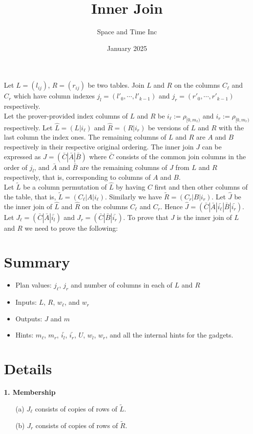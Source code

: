 \documentclass[11pt]{article}
\title{Inner Join}
\author{Space and Time Inc}
\date{January 2025}
\begin{document}
\maketitle

\noindent Let $L = (l_{ij})$, $R = (r_{ij})$ be two tables. Join $L$ and $R$ on the columns $C_\ell$ and $C_r$ which have column indexes $j_l = (l'_0,\cdots, l'_{k-1})$ and $j_r = (r'_0,\cdots, r'_{k-1})$ respectively. \\
\noindent Let the prover-provided index columns of $L$ and $R$ be $i_\ell:=\rho_{[0, m_\ell)}$ and $i_r:=\rho_{[0, m_r)}$ respectively. Let $\hat{L} = (L|i_\ell)$ and $\hat{R} = (R|i_r)$ be versions of $L$ and $R$ with the last column the index ones.  The remaining columns of $L$ and $R$ are $A$ and $B$ respectively in their respective original ordering. The inner join $J$ can be expressed as $J = (\bar{C}|\bar{A}|\bar{B})$ where $\bar{C}$ consists of the common join columns in the order of $j_l$, and $\bar{A}$ and $\bar{B}$ are the remaining columns of $J$ from $L$ and $R$ respectively, that is, corresponding to columns of $A$ and $B$.\\
\noindent Let $\tilde{L}$ be a column permutation of $\hat{L}$ by having $C$ first and then other columns of the table, that is, $\tilde{L} = (C_\ell|A|i_\ell)$. Similarly we have $\tilde{R} = (C_r|B|i_r)$. Let $\hat{J}$ be the inner join of $\hat{L}$ and $\hat{R}$ on the columns $C_\ell$ and $C_r$. Hence $\hat{J}=(\bar{C}|\bar{A}|\bar{i_\ell}|\bar{B}|\bar{i_r})$. Let $J_\ell=(\bar{C}|\bar{A}|\bar{i_l})$ and $J_r=(\bar{C}|\bar{B}|\bar{i_r})$. To prove that $J$ is the inner join of $L$ and $R$ we need to prove the following:\\

\section{Summary}
\begin{itemize}
    \item Plan values: $j_\ell$, $j_r$ and number of columns in each of $L$ and $R$
    \item Inputs: $L$, $R$, $w_\ell$, and $w_r$
    \item Outputs: $J$ and $m$
    \item Hints: $m_\ell$, $m_r$, $\bar{i_l}$, $\bar{i_r}$, $U$, $w_l$, $w_r$, and all the internal hints for the gadgets.
\end{itemize}

\section{Details}
\textbf{1. Membership}
\begin{enumerate}
  \item[(a)] $J_\ell$ consists of copies of rows of $\tilde{L}$.
  \item[(b)] $J_r$ consists of copies of rows of $\tilde{R}$.
\end{enumerate}
\end{document}
